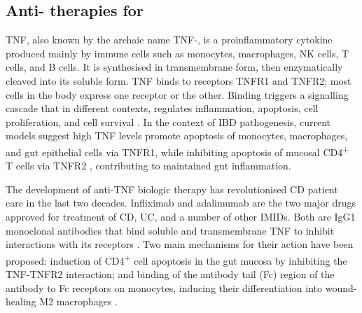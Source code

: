 \subsection{Anti- therapies for }

\Gls{TNF}, also known by the archaic name \gls{TNF}\nobreakdash-\textalpha, is a proinflammatory cytokine produced mainly by immune cells such as monocytes, macrophages, \gls{NK} cells, T cells, and B cells.
It is synthesised in transmembrane form, then enzymatically cleaved into its soluble form.
\gls{TNF} binds to receptors TNFR1 and TNFR2; most cells in the body express one receptor or the other.
Binding triggers a signalling cascade that in different contexts, regulates inflammation, apoptosis, cell proliferation, and cell survival \autocite{aggarwal2003SignallingPathwaysTNF,kalliolias2016TNFBiologyPathogenic,digby-bell2019InterrogatingHostImmunity}.
In the context of \gls{IBD} pathogenesis, 
current models suggest high \gls{TNF} levels promote apoptosis of monocytes, macrophages, and gut epithelial cells via TNFR1, while inhibiting apoptosis of mucosal CD4\textsuperscript{+} T cells via TNFR2 \autocite{levin2016MechanismActionAntiTNF,adegbola2018AntiTNFTherapyCrohn,digby-bell2019InterrogatingHostImmunity},
contributing to maintained gut inflammation.

The development of anti-\gls{TNF} biologic therapy has revolutionised \gls{CD} patient care in the last two decades.
Infliximab and adalimumab are the two major drugs approved for treatment of \gls{CD}, \gls{UC}, and a number of other \glspl{IMID}.
Both are IgG1 monoclonal antibodies that bind soluble and transmembrane \gls{TNF} to inhibit interactions with its receptors \autocite{lichtenstein2013ComprehensiveReviewAntitumor,adegbola2018AntiTNFTherapyCrohn}.
Two main mechanisms for their action have been proposed: induction of CD4\textsuperscript{+} cell apoptosis in the gut mucosa by inhibiting the \gls{TNF}-TNFR2 interaction; and binding of the antibody tail (Fc) region of the antibody to Fc receptors on monocytes, inducing their differentiation into wound-healing M2 macrophages \autocite{levin2016MechanismActionAntiTNF}.

